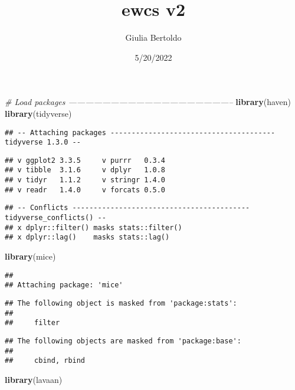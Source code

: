 \documentclass[
]{article}
\title{ewcs v2}
\author{Giulia Bertoldo}
\date{5/20/2022}
\newenvironment{Shaded}{\begin{snugshade}}{\end{snugshade}}
\newcommand{\CommentTok}[1]{\textcolor[rgb]{0.56,0.35,0.01}{\textit{#1}}}
\newcommand{\KeywordTok}[1]{\textcolor[rgb]{0.13,0.29,0.53}{\textbf{#1}}}
\newcommand{\NormalTok}[1]{#1}
\begin{document}
\maketitle

\begin{Shaded}
\begin{Highlighting}[]
\CommentTok{# Load packages -----------------------------------------------------------}
\KeywordTok{library}\NormalTok{(haven)}
\KeywordTok{library}\NormalTok{(tidyverse)}
\end{Highlighting}
\end{Shaded}

\begin{verbatim}
## -- Attaching packages --------------------------------------- tidyverse 1.3.0 --
\end{verbatim}

\begin{verbatim}
## v ggplot2 3.3.5     v purrr   0.3.4
## v tibble  3.1.6     v dplyr   1.0.8
## v tidyr   1.1.2     v stringr 1.4.0
## v readr   1.4.0     v forcats 0.5.0
\end{verbatim}

\begin{verbatim}
## -- Conflicts ------------------------------------------ tidyverse_conflicts() --
## x dplyr::filter() masks stats::filter()
## x dplyr::lag()    masks stats::lag()
\end{verbatim}

\begin{Shaded}
\begin{Highlighting}[]
\KeywordTok{library}\NormalTok{(mice)}
\end{Highlighting}
\end{Shaded}

\begin{verbatim}
## 
## Attaching package: 'mice'
\end{verbatim}

\begin{verbatim}
## The following object is masked from 'package:stats':
## 
##     filter
\end{verbatim}

\begin{verbatim}
## The following objects are masked from 'package:base':
## 
##     cbind, rbind
\end{verbatim}

\begin{Shaded}
\begin{Highlighting}[]
\KeywordTok{library}\NormalTok{(lavaan)}
\end{Highlighting}
\end{Shaded}
\end{document}
